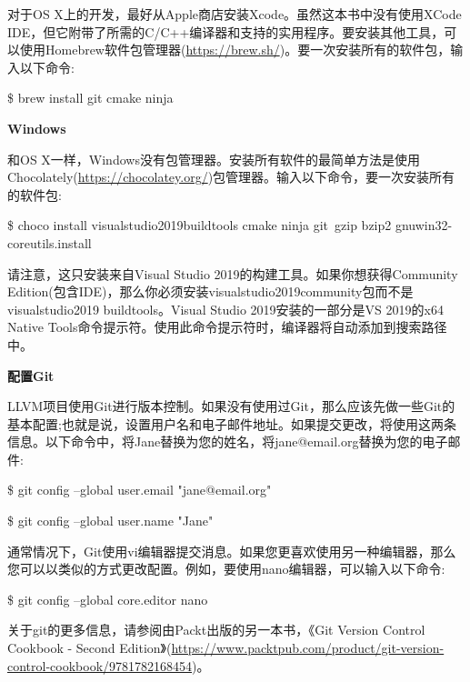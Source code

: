 对于OS X上的开发，最好从Apple商店安装Xcode。虽然这本书中没有使用XCode IDE，但它附带了所需的C/C++编译器和支持的实用程序。要安装其他工具，可以使用Homebrew软件包管理器(\url{https://brew.sh/})。要一次安装所有的软件包，输入以下命令:\par

\begin{tcolorbox}[colback=white,colframe=black]
	\$ brew install git cmake ninja
\end{tcolorbox}

\hspace*{\fill} \par %
\textbf{Windows}

和OS X一样，Windows没有包管理器。安装所有软件的最简单方法是使用Chocolately(\url{https://chocolatey.org/})包管理器。输入以下命令，要一次安装所有的软件包:\par

\begin{tcolorbox}[colback=white,colframe=black]
\$ choco install visualstudio2019buildtools cmake ninja git\
	gzip bzip2 gnuwin32-coreutils.install
\end{tcolorbox}

请注意，这只安装来自Visual Studio 2019的构建工具。如果你想获得Community Edition(包含IDE)，那么你必须安装visualstudio2019community包而不是visualstudio2019 buildtools。Visual Studio 2019安装的一部分是VS 2019的x64 Native Tools命令提示符。使用此命令提示符时，编译器将自动添加到搜索路径中。\par

\hspace*{\fill} \par %
\textbf{配置Git}

LLVM项目使用Git进行版本控制。如果没有使用过Git，那么应该先做一些Git的基本配置;也就是说，设置用户名和电子邮件地址。如果提交更改，将使用这两条信息。以下命令中，将Jane替换为您的姓名，将jane@email.org替换为您的电子邮件:\par

\begin{tcolorbox}[colback=white,colframe=black]
	\$ git config --global user.email "jane@email.org"
\end{tcolorbox}

\begin{tcolorbox}[colback=white,colframe=black]
	\$ git config --global user.name "Jane"
\end{tcolorbox}

通常情况下，Git使用vi编辑器提交消息。如果您更喜欢使用另一种编辑器，那么您可以以类似的方式更改配置。例如，要使用nano编辑器，可以输入以下命令:\par

\begin{tcolorbox}[colback=white,colframe=black]
	\$ git config --global core.editor nano
\end{tcolorbox}

关于git的更多信息，请参阅由Packt出版的另一本书，《Git Version Control Cookbook - Second Edition》(\url{https://www.packtpub.com/product/git-version-control-cookbook/9781782168454})。\par






